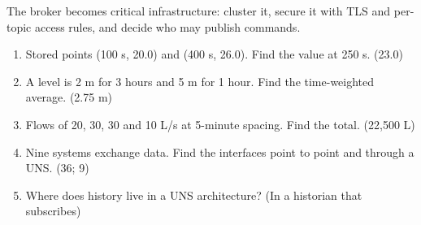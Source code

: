 The broker becomes critical infrastructure: cluster it, secure it with TLS and per-topic access rules, and decide who may publish commands.

\begin{enumerate}
\item Stored points (100 s, 20.0) and (400 s, 26.0). Find the value at 250 s. (23.0)
\item A level is 2 m for 3 hours and 5 m for 1 hour. Find the time-weighted average. (2.75 m)
\item Flows of 20, 30, 30 and 10 L/s at 5-minute spacing. Find the total. (22,500 L)
\item Nine systems exchange data. Find the interfaces point to point and through a UNS. (36; 9)
\item Where does history live in a UNS architecture? (In a historian that subscribes)
\end{enumerate}
